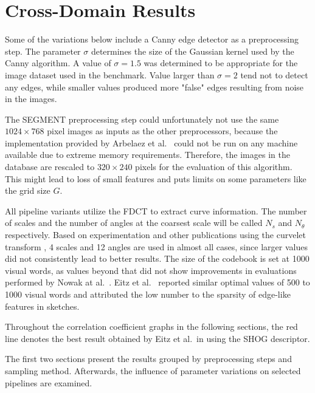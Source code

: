 \section{Cross-Domain Results}\label{sec:cross_results}

Some of the variations below include a Canny edge detector as a preprocessing
step. The parameter $\sigma$ determines the size of the Gaussian kernel used by
the Canny algorithm. A value of $\sigma = 1.5$ was determined to be appropriate
for the image dataset used in the benchmark. Value larger than $\sigma = 2$
tend not to detect any edges, while smaller values produced more "false" edges
resulting from noise in the images.

The SEGMENT preprocessing step could unfortunately not use the same $1024
\times 768$ pixel images as inputs as the other preprocessors, because the
implementation provided by Arbelaez et al.\ \autocite{arbelaez_contour_2011}
could not be run on any machine available due to extreme memory requirements.
Therefore, the images in the database are rescaled to $320 \times 240$ pixels
for the evaluation of this algorithm. This might lead to loss of small features
    and puts limits on some parameters like the grid size $G$.

All pipeline variants utilize the FDCT to extract curve information. The number
of scales and the number of angles at the coarsest scale will be called $N_s$
and $N_{\theta}$ respectively. Based on experimentation and other publications
using the curvelet transform \autocite{mandal_curvelet_2009}
\autocite{guha_curvelet_????}, 4 scales and 12 angles are used in almost all
cases, since larger values did not consistently lead to better results. The
size of the codebook is set at 1000 visual words, as values beyond that did
not show improvements in evaluations performed by Nowak at al.\
\autocite{nowak_sampling_2006}. Eitz et al.\ \autocite{eitz_sketch-based_2010}
reported similar optimal values of 500 to 1000 visual words and attributed the
low number to the sparsity of edge-like features in sketches.

Throughout the correlation coefficient graphs in the following sections, the
red line denotes the best result obtained by Eitz et al.\ in
\autocite{eitz_sketch-based_2010} using the SHOG descriptor.

The first two sections present the results grouped by preprocessing steps and
sampling method. Afterwards, the influence of parameter variations on selected
pipelines are examined.





